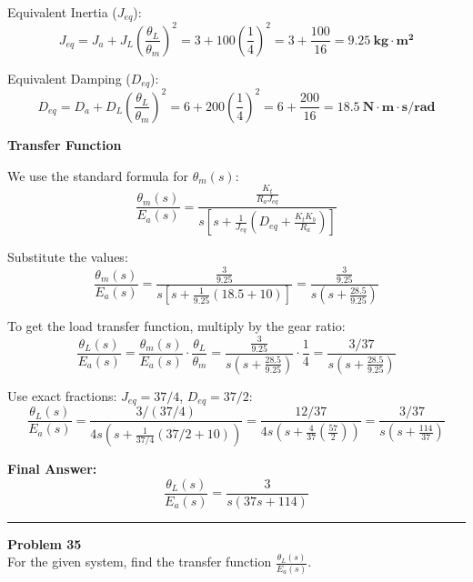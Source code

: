 \documentclass[11pt]{article}
\begin{document}
\vspace{5pt}
{Equivalent Inertia ($J_{eq}$):}
\[
J_{eq} = J_a + J_L\left(\frac{\theta_L}{\theta_m}\right)^2
= 3 + 100\left(\frac{1}{4}\right)^2 = 3 + \frac{100}{16}
= \mathbf{9.25\ \text{kg}\cdot\text{m}^2}
\]

\vspace{5pt}
{Equivalent Damping ($D_{eq}$):}
\[
D_{eq} = D_a + D_L\left(\frac{\theta_L}{\theta_m}\right)^2
= 6 + 200\left(\frac{1}{4}\right)^2 = 6 + \frac{200}{16}
= \mathbf{18.5\ \text{N}\cdot\text{m}\cdot\text{s/rad}}
\]

\vspace{5pt}
\noindent\textbf{Transfer Function}

\vspace{5pt}
We use the standard formula for $\theta_m(s)$:
\[
\frac{\theta_m(s)}{E_a(s)} = \frac{\frac{K_t}{R_a J_{eq}}}
{s\left[s + \frac{1}{J_{eq}}\left(D_{eq} + \frac{K_t K_b}{R_a}\right)\right]}
\]

Substitute the values:
\[
\frac{\theta_m(s)}{E_a(s)} = \frac{\frac{3}{9.25}}
{s\left[s + \frac{1}{9.25}(18.5 + 10)\right]}
= \frac{\frac{3}{9.25}}{s\left(s + \frac{28.5}{9.25}\right)}
\]

To get the load transfer function, multiply by the gear ratio:
\[
\frac{\theta_L(s)}{E_a(s)} = \frac{\theta_m(s)}{E_a(s)} \cdot \frac{\theta_L}{\theta_m}
= \frac{\frac{3}{9.25}}{s\left(s + \frac{28.5}{9.25}\right)} \cdot \frac{1}{4}
= \frac{3 / 37}{s\left(s + \frac{28.5}{9.25}\right)}
\]

Use exact fractions: $J_{eq} = 37/4$, $D_{eq} = 37/2$:
\[
\frac{\theta_L(s)}{E_a(s)} =
\frac{3 / (37/4)}{4s\left(s + \frac{1}{37/4}(37/2 + 10)\right)}
= \frac{12/37}{4s\left(s + \frac{4}{37}\left(\frac{57}{2}\right)\right)}
= \frac{3/37}{s\left(s + \frac{114}{37}\right)}
\]

\vspace{5pt}
\noindent\textbf{Final Answer:}
\[
\boxed{
\frac{\theta_L(s)}{E_a(s)} = \frac{3}{s(37s + 114)}
}
\]



\newpage
\noindent\rule{\textwidth}{1pt}
\noindent\textbf{Problem 35} \hfill 
\\ For the given system, find the transfer function $\frac{\theta_L(s)}{E_a(s)}$.
\end{document}
